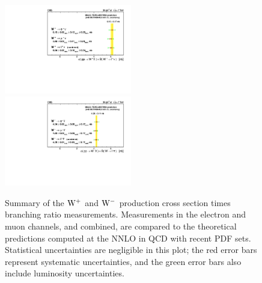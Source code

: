 \begin{figure}[htbp]
\begin{center}
  \includegraphics[width=0.495\textwidth]{figs/Results_W_plus.pdf}
  \includegraphics[width=0.495\textwidth]{figs/Results_W_minus.pdf}
\caption[.]{\label{fig:WPM_LEPstylePlots}
Summary of the $\mathrm{W^+}$ and $\mathrm{W^-}$ production cross section times branching ratio measurements.
Measurements in the electron and muon channels, and combined, are compared to the
theoretical predictions computed at the NNLO in QCD with recent PDF sets.
Statistical uncertainties are negligible in this plot; the red error bars represent systematic uncertainties,
and the green error bars also include luminosity uncertainties.
}
\end{center}
\end{figure}

